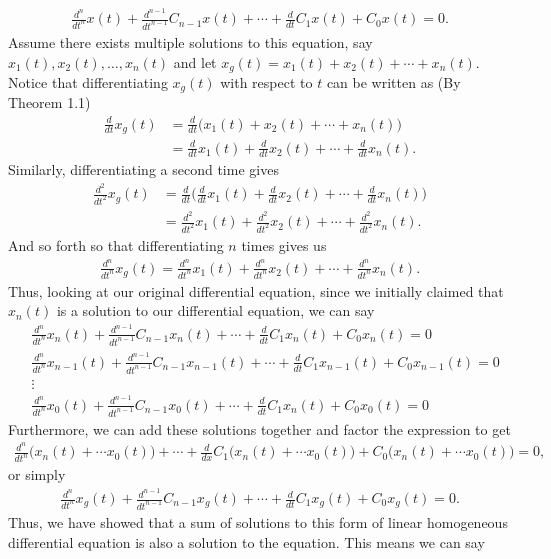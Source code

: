 \begin{align}
\frac{d^n}{dt^n}x(t)+\frac{d^{n-1}}{dt^{n-1}}C_{n-1}x(t)+\cdots+\frac{d}{dt}C_1x(t)+C_0x(t)=0.
\end{align}
Assume there exists multiple solutions to this equation, say $x_1(t),x_2(t),\dots,x_n(t)$ and let $x_g(t)=x_1(t)+x_2(t)+\cdots+x_n(t)$. Notice that differentiating $x_g(t)$ with respect to $t$ can be written as (By Theorem 1.1)
\begin{align}
\frac{d}{dt}x_g(t) &=\frac{d}{dt}\big(x_1(t)+x_2(t)+\cdots+x_n(t) \big) \\
&=\frac{d}{dt}x_1(t)+\frac{d}{dt}x_2(t)+\cdots+\frac{d}{dt}x_n(t).
\end{align}
Similarly, differentiating a second time gives
\begin{align}
\frac{d^2}{dt^2}x_g(t) &= \frac{d}{dt}\bigg(\frac{d}{dt}x_1(t)+\frac{d}{dt}x_2(t)+\cdots+\frac{d}{dt}x_n(t)\bigg) \\
&=\frac{d^2}{dt^2}x_1(t)+\frac{d^2}{dt^2}x_2(t)+\cdots+\frac{d^2}{dt^2}x_n(t).
\end{align}
And so forth so that differentiating $n$ times gives us
\begin{align}
\frac{d^n}{dt^n}x_g(t)=\frac{d^n}{dt^n}x_1(t)+\frac{d^n}{dt^n}x_2(t)+\cdots+\frac{d^n}{dt^n}x_n(t).
\end{align}
Thus, looking at our original differential equation, since we initially claimed that $x_n(t)$ is a solution to our differential equation, we can say
\begin{align}
&\frac{d^n}{dt^n}x_n(t)+\frac{d^{n-1}}{dt^{n-1}}C_{n-1}x_n(t)+\cdots+\frac{d}{dt}C_1x_n(t)+C_0x_n(t)=0 \\
&\frac{d^n}{dt^n}x_{n-1}(t)+\frac{d^{n-1}}{dt^{n-1}}C_{n-1}x_{n-1
}(t)+\cdots+\frac{d}{dt}C_1x_{n-1}(t)+C_0x_{n-1}(t)=0 \\
& \vdots \nonumber \\
&\frac{d^n}{dt^n}x_0(t)+\frac{d^{n-1}}{dt^{n-1}}C_{n-1}x_0(t)+\cdots+\frac{d}{dt}C_1x_n(t)+C_0x_0(t)=0
\end{align}
Furthermore, we can add these solutions together and factor the expression to get
\begin{align}
\frac{d^n}{dt^n}\big(x_n(t)+\cdots x_0(t)\big)+\cdots+\frac{d}{dx}C_1\big(x_n(t)+\cdots x_0(t)\big)+C_0\big(x_n(t)+\cdots x_0(t)\big)=0,
\end{align}
or simply
\begin{align}
\frac{d^n}{dt^n}x_g(t)+\frac{d^{n-1}}{dt^{n-1}}C_{n-1}x_g(t)+\cdots+\frac{d}{dt}C_1x_g(t)+C_0x_g(t)=0.
\end{align}
Thus, we have showed that a sum of solutions to this form of linear homogeneous differential equation is also a solution to the equation. This means we can say









